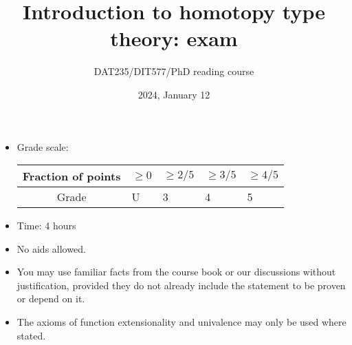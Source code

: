 \documentclass[11pt]{article}
\begin{document}
\title{Introduction to homotopy type theory: exam}
\author{DAT235/DIT577/PhD reading course}
\date{2024, January 12}

\maketitle

\begin{itemize}
\item
Grade scale:\qquad
\begin{tabularx}{10cm}{|c|Y|Y|Y|Y|}
  \hline
  Fraction of points & $\geq 0$ & $\geq 2/5$ & $\geq 3/5$ & $\geq 4/5$
  \\\hline
  Grade & U & 3 & 4 & 5
  \\\hline
\end{tabularx}
\item
Time: 4 hours
\item
No aids allowed.
\item
You may use familiar facts from the course book or our discussions without justification, provided they do not already include the statement to be proven or depend on it.
\item
The axioms of function extensionality and univalence may only be used where stated. 
\end{itemize}

\newpage
\end{document}
